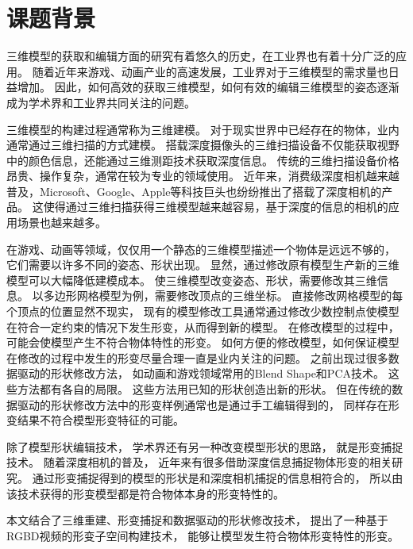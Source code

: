 
\section{课题背景}
三维模型的获取和编辑方面的研究有着悠久的历史，在工业界也有着十分广泛的应用。
随着近年来游戏、动画产业的高速发展，工业界对于三维模型的需求量也日益增加。
因此，如何高效的获取三维模型，如何有效的编辑三维模型的姿态逐渐成为学术界和工业界共同关注的问题。

三维模型的构建过程通常称为三维建模。
对于现实世界中已经存在的物体，业内通常通过三维扫描的方式建模。
搭载深度摄像头的三维扫描设备不仅能获取视野中的颜色信息，还能通过三维测距技术获取深度信息。
传统的三维扫描设备价格昂贵、操作复杂，通常在较为专业的领域使用。
近年来，消费级深度相机越来越普及，Microsoft、Google、Apple等科技巨头也纷纷推出了搭载了深度相机的产品。
这使得通过三维扫描获得三维模型越来越容易，基于深度的信息的相机的应用场景也越来越多。

在游戏、动画等领域，仅仅用一个静态的三维模型描述一个物体是远远不够的，
它们需要以许多不同的姿态、形状出现。
显然，通过修改原有模型生产新的三维模型可以大幅降低建模成本。
使三维模型改变姿态、形状，需要修改其三维信息。
以多边形网格模型为例，需要修改顶点的三维坐标。
直接修改网格模型的每个顶点的位置显然不现实，
现有的模型修改工具通常通过修改少数控制点使模型在符合一定约束的情况下发生形变，从而得到新的模型。
在修改模型的过程中，可能会使模型产生不符合物体特性的形变。
如何方便的修改模型，如何保证模型在修改的过程中发生的形变尽量合理一直是业内关注的问题。
之前出现过很多数据驱动的形状修改方法，
如动画和游戏领域常用的Blend Shape和PCA技术。
这些方法都有各自的局限。
这些方法用已知的形状创造出新的形状。
但在传统的数据驱动的形状修改方法中的形变样例通常也是通过手工编辑得到的，
同样存在形变结果不符合模型形变特征的可能。

除了模型形状编辑技术，
学术界还有另一种改变模型形状的思路，
就是形变捕捉技术。
随着深度相机的普及，
近年来有很多借助深度信息捕捉物体形变的相关研究。
通过形变捕捉得到的模型的形状是和深度相机捕捉的信息相符合的，
所以由该技术获得的形变模型都是符合物体本身的形变特性的。

本文结合了三维重建、形变捕捉和数据驱动的形状修改技术，
提出了一种基于RGBD视频的形变子空间构建技术，
能够让模型发生符合物体形变特性的形变。